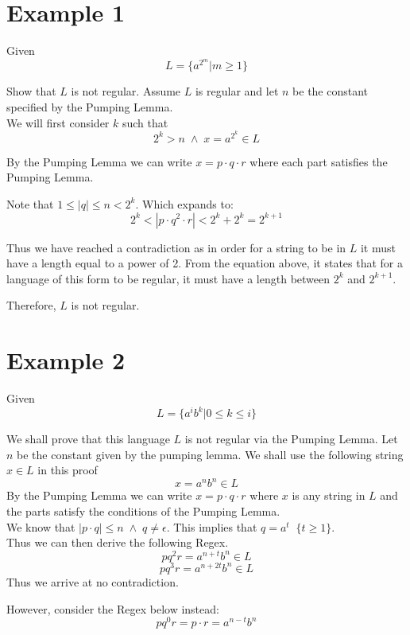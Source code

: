 \documentclass[12pt]{book}
\title{\coursetitle\linebreak\lecturename}
\author{\\Cain Susko\\ 
           \\ \\ \\
      Queen's University 
    \\School of Computing\\}
\begin{document}
\begin{titlepage}
        \maketitle
\end{titlepage}

{\small
\section*{Example 1}
Given \[L = \{a^{2^m} | m \geq 1\}\]

Show that  $L$ is not regular.
Assume  $L$ is regular and let  $n$ be the constant specified by the Pumping Lemma.\\
We will first consider $k$ such that 
\[2^k>n\;\wedge\;x=a^{2^k}\in L\]

By the Pumping Lemma we can write $x=p\cdot q\cdot r$ where each part satisfies the Pumping Lemma.

Note that $1\leq |q|\leq n<2^k$. 
Which expands to:
\[2^k < | p\cdot q^2\cdot r | < 2^k+2^k=2^{k+1}\]

Thus we have reached a contradiction as in order for a string to be in $L$ it must have a length equal to 
        a power of 2. 
From the equation above, it states that for a language of this form to be regular, it must have a length between $2^k$ and 
        $2^{k+1}$.

Therefore,  $L$ is not regular.
}


\section*{Example 2}
Given
\[L=\{a^ib^k | 0\leq k\leq i\}\]

We shall prove that this language $L$ is not regular via the Pumping Lemma.
Let $n$ be the constant given by the pumping lemma. 
We shall use the following string $x\in L$ in this proof
\[x=a^nb^n\in L\]
By the Pumping Lemma we can write $x = p\cdot q\cdot r$ where $x$ is any string in  $L$ and the parts satisfy the conditions of the Pumping Lemma.\\
We know that $|p\cdot q|\leq n\;\wedge\;q\neq\epsilon$. This implies that  $q=a^t\;\;\{t\geq 1\}$.\\
Thus we can then derive the following Regex.
\[pq^2r = a^{n+t}b^n\in L\]
\[pq^3r = a^{n+2t}b^n\in L\]
Thus we arrive at no contradiction. 

However, consider the Regex below instead:
\[pq^0r = p\cdot r = a^{n-t}b^n\]
\end{document}
